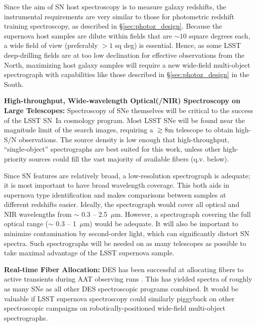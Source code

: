 Since the aim of SN host spectroscopy is to measure galaxy redshifts, the instrumental requirements are very similar to those for photometric redshift training spectroscopy, as described in \S \ref{sec:photoz_design}.  Because the supernova host samples are dilute within fields that are $\sim 10$ square degrees each, a wide field of view (preferably $>1$ sq deg) is essential.   Hence, as some LSST deep-drilling fields are at too low declination for effective observations from the North, maximizing host galaxy samples will require a new wide-field multi-object spectrograph with capabilities like those described in \S \ref{sec:photoz_design} in the South.


{\bf High-throughput, Wide-wavelength Optical(/NIR) Spectroscopy on Large Telescopes:}  Spectroscopy of SNe themselves will be critical to the success of the LSST
SN~Ia cosmology program.  Most LSST SNe will be found near the
magnitude limit of the search images, requiring a $\gtrsim$8m
telescope to obtain high-S/N observations.  The source density is low enough that high-throughput, ``single-object'' spectrographs are best suited for this work, unless other high-priority sources could fill the vast majority of available fibers (q.v. below).  

Since SN features are relatively broad, a low-resolution spectrograph
is adequate; it is most important to have broad wavelength coverage.  This both aids in
supernova type identification and
makes comparisons between samples at different redshifts easier.  Ideally, the spectrograph
would cover all optical and NIR wavelengths from $\sim$ 0.3 --
2.5~$\mu$m.  However, a spectrograph covering the full optical range
($\sim$ 0.3 -- 1~$\mu$m) would be adequate.   It will also be important to minimize contamination by second-order light, which can significantly distort SN spectra.  Such spectrographs will be needed on as many telescopes as possible to take maximal advantage of the LSST supernova sample.


{\bf Real-time Fiber Allocation:}  DES has been successful at allocating fibers to active transients
during AAT observing runs \citep{Yuan15}.  This has yielded spectra of roughly as
many SNe as all other DES spectroscopic programs combined.  It would be valuable if LSST supernova spectroscopy could similarly piggyback on other spectroscopic campaigns on robotically-positioned wide-field multi-object spectrographs.  



